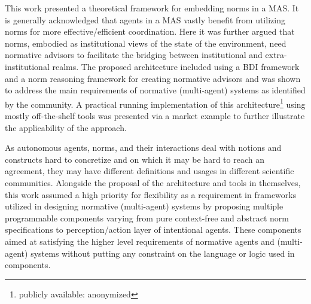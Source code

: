This work presented a theoretical framework for embedding norms in a MAS. It is generally acknowledged that agents in a MAS vastly benefit from utilizing norms for more effective/efficient coordination. Here it was further argued that norms, embodied as institutional views of the state of the environment, need normative advisors to facilitate the bridging between institutional and extra-institutional realms. The proposed architecture included using a BDI framework and a norm reasoning framework for creating normative advisors and was shown to address the main requirements of normative (multi-agent) systems as identified by the community. A practical running implementation of this architecture\footnote{publicly available: anonymized} using mostly off-the-shelf tools was presented via a market example to further illustrate the applicability of the approach.

As autonomous agents, norms, and their interactions deal with notions and constructs hard to concretize and on which it may be hard to reach an agreement, they may have different definitions and usages in different scientific communities. Alongside the proposal of the architecture and tools in themselves, this work assumed a high priority for flexibility as a requirement in frameworks utilized in designing normative (multi-agent) systems by proposing multiple programmable components varying from pure context-free and abstract norm specifications to perception/action layer of intentional agents. These components aimed at satisfying the higher level requirements of normative agents and (multi-agent) systems without putting any constraint on the language or logic used in components.



